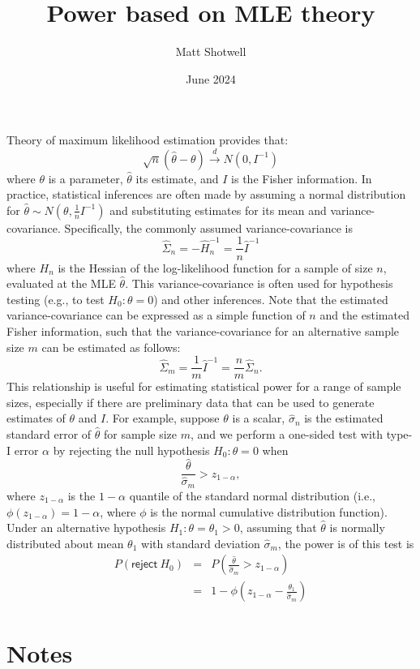 \documentclass{article}
\title{Power based on MLE theory}
\author{Matt Shotwell}
\date{June 2024}
\begin{document}
\maketitle
\Large
\noindent Theory of maximum likelihood estimation provides that:
$$
\sqrt{n}(\hat{\theta} - \theta) \stackrel{d}{\rightarrow} N(0, I^{-1})
$$
where $\theta$ is a parameter, $\hat{\theta}$ its estimate, and $I$ is the Fisher information. In practice, statistical inferences are often made by assuming a normal distribution for $\hat{\theta} \sim N(\theta, \frac{1}{n}I^{-1})$ and substituting estimates for its mean and variance-covariance. Specifically, the commonly assumed variance-covariance is 
$$
\hat{\Sigma}_n = -\hat{H}_n^{-1} = \frac{1}{n}\hat{I}^{-1}
$$
where $H_n$ is the Hessian of the log-likelihood function for a sample of size $n$, evaluated at the MLE $\hat{\theta}$. This variance-covariance is often used  for hypothesis testing (e.g., to test $H_0: \theta = 0$) and other inferences. Note that the estimated variance-covariance can be expressed as a simple function of $n$ and the estimated Fisher information, such that the variance-covariance for an alternative sample size $m$ can be estimated as follows:
$$
\hat{\Sigma}_m = \frac{1}{m}\hat{I}^{-1} = \frac{n}{m}\hat{\Sigma}_n.
$$
This relationship is useful for estimating statistical power for a range of sample sizes, especially if there are preliminary data that can be used to generate estimates of $\theta$ and $I$. For example, suppose $\theta$ is a scalar, $\hat{\sigma}_n$ is the estimated standard error of $\hat{\theta}$ for sample size $m$, and we perform a one-sided test with type-I error $\alpha$ by rejecting the null hypothesis $H_0: \theta = 0$ when
$$
\frac{\hat{\theta}}{\hat{\sigma}_m} > z_{1-\alpha},
$$
where $z_{1-\alpha}$ is the $1-\alpha$ quantile of the standard normal distribution (i.e., $\phi(z_{1-\alpha}) = 1-\alpha$, where $\phi$ is the normal cumulative distribution function). Under an alternative hypothesis $H_1: \theta = \theta_1 > 0$, assuming that $\hat{\theta}$ is normally distributed about mean $\theta_1$ with standard deviation $\hat{\sigma}_m$, the power is of this test is 
\begin{eqnarray}
P(\mathsf{reject}\ H_0) &=& P\left(\frac{\hat{\theta}}{\hat{\sigma}_m} > z_{1-\alpha}\right) \nonumber \\
&=& 1-\phi\left(z_{1-\alpha} - \frac{\theta_1}{\hat{\sigma}_m}\right) \nonumber
\end{eqnarray}

\section{Notes}
\end{document}
